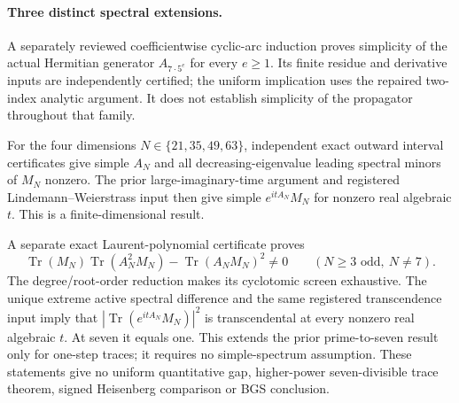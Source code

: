 \paragraph{Three distinct spectral extensions.}
A separately reviewed coefficientwise cyclic-arc induction proves simplicity
of the actual Hermitian generator $A_{7\cdot5^e}$ for every $e\ge1$.
Its finite residue and derivative inputs are independently certified; the
uniform implication uses the repaired two-index analytic argument.
It does not establish simplicity of the propagator throughout that family.

For the four dimensions $N\in\{21,35,49,63\}$, independent exact outward
interval certificates give simple $A_N$ and all decreasing-eigenvalue leading
spectral minors of $M_N$ nonzero. The prior large-imaginary-time argument and
registered Lindemann--Weierstrass input then give simple $e^{itA_N}M_N$ for
nonzero real algebraic $t$. This is a finite-dimensional result.

A separate exact Laurent-polynomial certificate proves
\[
 \operatorname{Tr}(M_N)\operatorname{Tr}(A_N^2M_N)
 -\operatorname{Tr}(A_NM_N)^2\ne0
 \qquad(N\ge3\text{ odd},\ N\ne7).
\]
The degree/root-order reduction makes its cyclotomic screen exhaustive.
The unique extreme active spectral difference and the same registered
transcendence input imply that $|\operatorname{Tr}(e^{itA_N}M_N)|^2$ is
transcendental at every nonzero real algebraic $t$. At seven it equals one.
This extends the prior prime-to-seven result only for one-step traces;
it requires no simple-spectrum assumption. These statements give no uniform
quantitative gap, higher-power seven-divisible trace theorem, signed
Heisenberg comparison or BGS conclusion.
